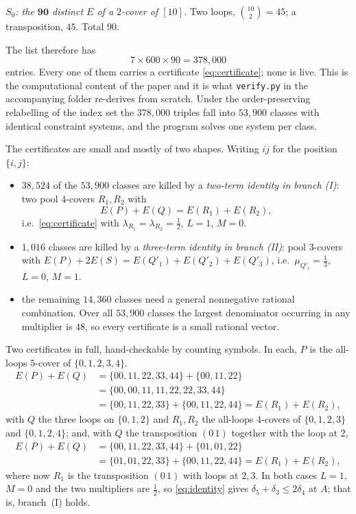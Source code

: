 \documentclass[11pt]{amsart}
\newcommand{\dd}{\delta}
\newcommand{\Ee}{E}
\begin{document}
\medskip
\noindent\emph{$S_0$: the $\mathbf{90}$ distinct $\Ee$ of a $2$-cover of
$[10]$.}
Two loops, $\binom{10}{2}=45$; a transposition, $45$. Total $90$.

\medskip
\noindent The list therefore has
\[
 7\times600\times90=378{,}000
\]
entries. Every one of them carries a certificate \eqref{eq:certificate}; none is
live. This is the computational content of the paper and it is what
\texttt{verify.py} in the accompanying folder re-derives from scratch. Under the
order-preserving relabelling of the index set the $378{,}000$ triples fall into
$53{,}900$ classes with identical constraint systems, and the program solves one
system per class.

The certificates are small and mostly of two shapes. Writing $ij$ for the
position $\{i,j\}$:

\begin{itemize}
\item $38{,}524$ of the $53{,}900$ classes are killed by a
\emph{two-term identity in branch \textup{(I)}}: two pool $4$-covers $R_1,R_2$
with
\[
 \Ee(P)+\Ee(Q)=\Ee(R_1)+\Ee(R_2),
\]
i.e.\ \eqref{eq:certificate} with $\lambda_{R_1}=\lambda_{R_2}=\tfrac12$,
$L=1$, $M=0$.
\item $1{,}016$ classes are killed by a \emph{three-term identity in branch
\textup{(II)}}: pool $3$-covers with
$\Ee(P)+2\Ee(S)=\Ee(Q'_1)+\Ee(Q'_2)+\Ee(Q'_3)$, i.e.\
$\mu_{Q'_i}=\tfrac13$, $L=0$, $M=1$.
\item the remaining $14{,}360$ classes need a general nonnegative rational
combination. Over all $53{,}900$ classes the largest denominator occurring in
any multiplier is $48$, so every certificate is a small rational vector.
\end{itemize}

Two certificates in full, hand-checkable by counting symbols. In each, $P$ is
the all-loops $5$-cover of $\{0,1,2,3,4\}$.
\begin{align*}
 \Ee(P)+\Ee(Q)
 &=\{00,11,22,33,44\}+\{00,11,22\}\\
 &=\{00,00,11,11,22,22,33,44\}\\
 &=\{00,11,22,33\}+\{00,11,22,44\}
 =\Ee(R_1)+\Ee(R_2),
\end{align*}
with $Q$ the three loops on $\{0,1,2\}$ and $R_1,R_2$ the all-loops $4$-covers
of $\{0,1,2,3\}$ and $\{0,1,2,4\}$; and, with $Q$ the transposition $(0\,1)$
together with the loop at $2$,
\begin{align*}
 \Ee(P)+\Ee(Q)
 &=\{00,11,22,33,44\}+\{01,01,22\}\\
 &=\{01,01,22,33\}+\{00,11,22,44\}
 =\Ee(R_1)+\Ee(R_2),
\end{align*}
where now $R_1$ is the transposition $(0\,1)$ with loops at $2,3$. In both
cases $L=1$, $M=0$ and the two multipliers are $\tfrac12$, so
\eqref{eq:identity} gives $\dd_5+\dd_3\le2\dd_4$ at $A$; that is, branch~(I)
holds.
\end{document}
